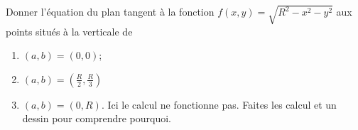 
\begin{exercice}\label{exoOutilsMath-0046}

    Donner l'équation du plan tangent à la fonction $f(x,y)=\sqrt{R^2-x^2-y^2}$ aux points situés à la verticale de
    \begin{enumerate}
        \item
            $(a,b)=(0,0)$;
        \item
            $(a,b)=(\frac{ R }{2},\frac{ R }{ 3 })$
        \item
            $(a,b)=(0,R)$. Ici le calcul ne fonctionne pas. Faites les calcul et un dessin pour comprendre pourquoi.
    \end{enumerate}

\end{exercice}
